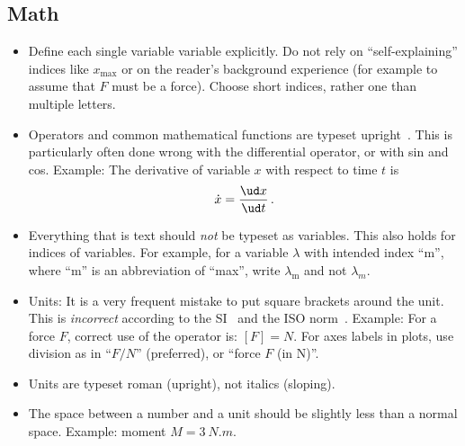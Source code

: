 \subsection{Math}
\begin{itemize}
	
	\item Define each single variable variable explicitly. Do not rely on ``self-explaining'' indices like $x_{\mathrm{max}}$ or on the reader's background experience (for example to assume that $F$ must be a force). Choose short indices, rather one than multiple letters. 
	

\item Operators and common mathematical functions are typeset upright~\cite{RedBook2010}. This is particularly often done wrong with the differential operator, or with sin and cos. Example: The derivative of variable $x$ with respect to time $t$ is
\begin{equation}
\dot{x}=\frac{\ud x}{\ud t} \, .
\label{eq:derivative}
\end{equation}

\item Everything that is text should \emph{not} be typeset as variables. This also holds for indices of variables. For example, for a variable $\lambda$ with intended index ``m'', where ``m'' is an abbreviation of ``max'', write $\lambda_{\mathrm{m}}$ and not $\lambda_m$.

\item Units: It is a very frequent mistake to put square brackets around the unit. This is \emph{incorrect} according to the SI~\cite{SIbrochure2006} and the ISO norm~\cite{ISOnormunits}. Example: For a force $F$, correct use of the operator is: $[F]=\si{N}$. For axes labels in plots, use division as in ``$F/\si{N}$'' (preferred), or ``force $F$ (in \si{N})''. %

\item Units are typeset roman (upright), not italics (sloping).

\item The space between a number and a unit should be slightly less than a normal space. %
Example: moment $M=\SI{3}{N.m}$.%


\end{itemize}
